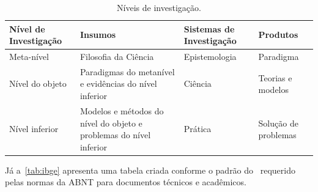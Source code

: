 \begin{table}[htb]
\ABNTEXfontereduzida{}
\caption[Níveis de investigação]{Níveis de investigação.}%
\label{tab:nivinv}
\begin{tabular}{p{2.6cm}p{6.0cm}p{2.25cm}p{3.40cm}}
  \toprule
  \textbf{Nível de Investigação} & \textbf{Insumos}                                                   & \textbf{Sistemas de Investigação} & \textbf{Produtos}    \\
  \midrule
  Meta-nível                     & Filosofia\index{filosofia} da Ciência                              & Epistemologia                     &
  Paradigma                                                                                                                                                      \\
  \midrule
  Nível do objeto                & Paradigmas do metanível e evidências do nível inferior             &
  Ciência                        & Teorias e modelos                                                                                                             \\
  \midrule
  Nível inferior                 & Modelos e métodos do nível do objeto e problemas do nível inferior & Prática                           & Solução de problemas \\
  \bottomrule
\end{tabular}
\end{table}

Já a~\autoref{tab:ibge} apresenta uma tabela criada conforme o padrão do~ requerido pelas normas da ABNT para documentos técnicos e
acadêmicos.

\begin{table}[htb]
\end{table}



